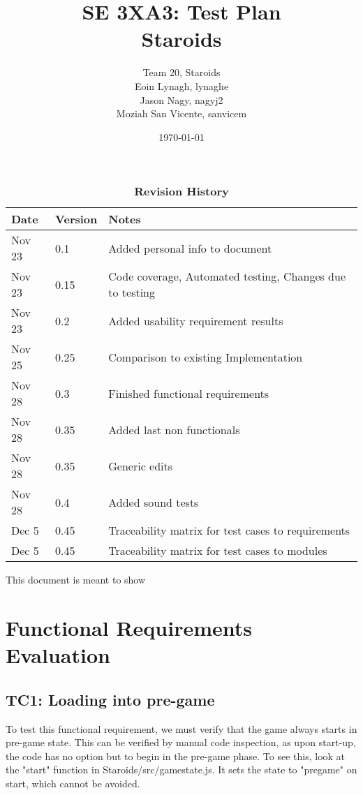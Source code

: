 \documentclass[12pt, titlepage]{article}
\title{SE 3XA3: Test Plan\\Staroids}
\author{Team 20, Staroids
		\\ Eoin Lynagh, lynaghe
		\\ Jason Nagy, nagyj2
		\\ Moziah San Vicente, sanvicem
}
\date{\today}
\begin{document}
\maketitle

\tableofcontents
\listoftables
\listoffigures

\begin{table}[bp]
\caption{\bf Revision History}
\begin{tabularx}{\textwidth}{p{3cm}p{2cm}X}
\toprule {\bf Date} & {\bf Version} & {\bf Notes}\\
\midrule
Nov 23 & 0.1 & Added personal info to document\\
Nov 23 & 0.15 & Code coverage, Automated testing, Changes due to testing\\
Nov 23 & 0.2 & Added usability requirement results\\
Nov 25 & 0.25 & Comparison to existing Implementation\\
Nov 28 & 0.3 & Finished functional requirements\\
Nov 28 & 0.35 & Added last non functionals\\
Nov 28 & 0.35 & Generic edits\\
Nov 28 & 0.4 & Added sound tests\\
Dec 5 & 0.45 & Traceability matrix for test cases to requirements\\
Dec 5 & 0.45 & Traceability matrix for test cases to modules\\
\bottomrule
\end{tabularx}
\end{table}

\newpage


This document is meant to show \\

\section{Functional Requirements Evaluation}
\subsection{TC1: Loading into pre-game}
To test this functional requirement, we must verify that the game always starts in pre-game state.
This can be verified by manual code inspection, as upon start-up,
the code has no option but to begin in the pre-game phase. To see this,
 look at the "start" function in Staroids/src/gamestate.js.
 It sets the state to "pregame" on start, which cannot be avoided.
\end{document}
